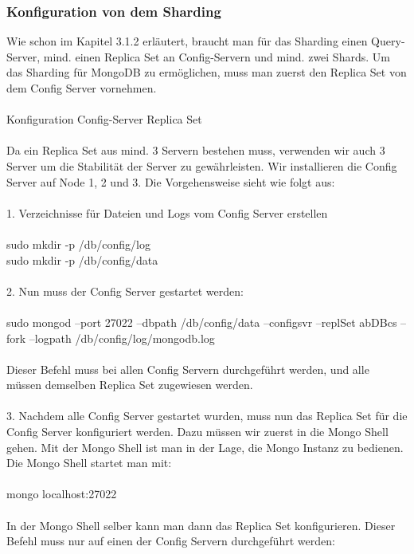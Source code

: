 \subsubsection{Konfiguration von dem Sharding}
Wie schon im Kapitel 3.1.2 erl\"autert, braucht man f\"ur das Sharding einen Query-Server, mind. einen Replica Set an Config-Servern und mind. zwei Shards. Um das Sharding f\"ur MongoDB zu erm\"oglichen, muss man zuerst den Replica Set von dem Config Server vornehmen.
\\
\\
Konfiguration Config-Server Replica Set
\\
\\
Da ein Replica Set aus mind. 3 Servern bestehen muss, verwenden wir auch 3 Server um die Stabilit\"at der Server zu gew\"ahrleisten. Wir installieren die Config Server auf Node 1, 2 und 3. Die Vorgehensweise sieht wie folgt aus:
\\
\\
1.	Verzeichnisse f\"ur Dateien und Logs vom Config Server erstellen
\\
\\
sudo mkdir -p /db/config/log
\\
sudo mkdir -p /db/config/data
\\
\\
2.	Nun muss der Config Server gestartet werden:
\\
\\
sudo mongod --port 27022 --dbpath /db/config/data --configsvr --replSet abDBcs --fork --logpath /db/config/log/mongodb.log
\\
\\
Dieser Befehl muss bei allen Config Servern durchgef\"uhrt werden, und alle m\"ussen demselben Replica Set zugewiesen werden.
\\
\\
3.	Nachdem alle Config Server gestartet wurden, muss nun das Replica Set f\"ur die Config Server konfiguriert werden. Dazu m\"ussen wir zuerst in die Mongo Shell gehen. Mit der Mongo Shell ist man in der Lage, die Mongo Instanz zu bedienen. Die Mongo Shell startet man mit: 
\\
\\
mongo localhost:27022
\\
\\
In der Mongo Shell selber kann man dann das Replica Set konfigurieren. Dieser Befehl muss nur auf einen der Config Servern durchgef\"uhrt werden:
\\
\\
